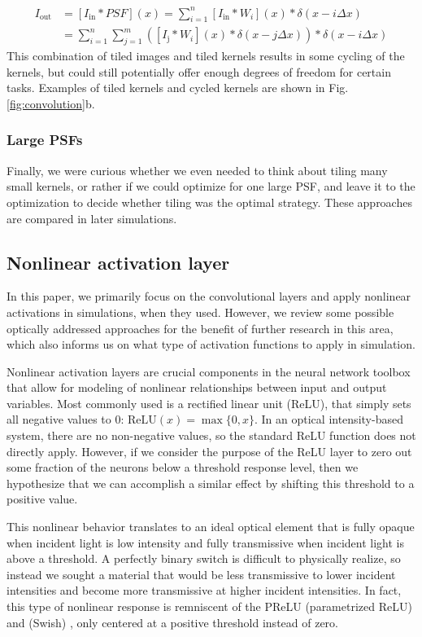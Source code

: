 \begin{align} I_\text{out} &= [I_\text{in} * PSF](x)= \sum_{i=1}^n [I_\text{in} * W_i](x) * \delta(x - i\Delta x)  \\
&= \sum_{i=1}^n \sum_{j=1}^m\left( [I_\text{j} *  W_i](x) * \delta(x - j\Delta x) \right) * \delta(x - i\Delta x) 
\end{align}
This combination of tiled images and tiled kernels results in some cycling of the kernels, but could still potentially offer enough degrees of freedom for certain tasks. Examples of tiled kernels and cycled kernels are shown in Fig. \ref{fig:convolution}b.

\subsubsection*{Large PSFs} Finally, we were curious whether we even needed to think about tiling many small kernels, or rather if we could optimize for one large PSF, and leave it to the optimization to decide whether tiling was the optimal strategy. These approaches are compared in later simulations.

\subsection*{Nonlinear activation layer}
In this paper, we primarily focus on the convolutional layers and apply nonlinear activations in simulations, when they used. However, we review some possible optically addressed approaches for the benefit of further research in this area, which also informs us on what type of activation functions to apply in simulation. 

Nonlinear activation layers are crucial components in the neural network toolbox that allow for modeling of nonlinear relationships between input and output variables. Most commonly used is a rectified linear unit (ReLU), that simply sets all negative values to 0: $\text{ReLU}(x) = \max\{0, x\}$. In an optical intensity-based system, there are no non-negative values, so the standard ReLU function does not directly apply. However, if we consider the purpose of the ReLU layer to zero out some fraction of the neurons below a threshold response level, then we hypothesize that we can accomplish a similar effect by shifting this threshold to a positive value. 

This nonlinear behavior translates to an ideal optical element that is fully opaque when incident light is low intensity and fully transmissive when incident light is above a threshold. A perfectly binary switch is difficult to physically realize, so instead we sought a material that would be less transmissive to lower incident intensities and become more transmissive at higher incident intensities. In fact, this type of nonlinear response is remniscent of the PReLU (parametrized ReLU) \cite{he2015delving} and (Swish) \cite{ramachandran2017searching}, only centered at a positive threshold instead of zero.

